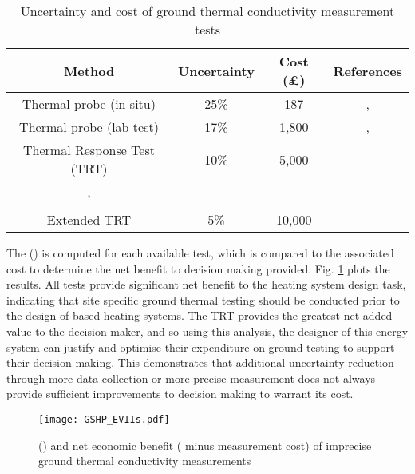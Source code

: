 \begin{table}[h]
    \centering
    \renewcommand{\arraystretch}{1}
    \begin{tabular}{c|c|c|c} \toprule \toprule
        Method & Uncertainty & Cost (£) & References \\ \midrule
        Thermal probe (in situ) & 25\% & 187 & {\footnotesize \citep{king2012FieldDeterminationShallow}, \citep{sunbeltrentals2023ThermtestTLS100Thermal}} \\
        Thermal probe (lab test) & 17\% & 1,800 & {\footnotesize \citep{low2013MeasuringSoilThermal}, \citep{basaltridgetestinglaboratory2024BasaltRidgeTesting}} \\
        Thermal Response Test (TRT) & 10\% & 5,000 & \makecell{\footnotesize \citep{choi2021DevelopmentChillerattachedApparatus},\\[-.5ex] \footnotesize\citep{spitler2000SituMeasurementGround},\\[-.5ex] \footnotesize\citep{tang2019SensitiveAnalysisEffective}} \\
        Extended TRT & 5\% & 10,000 & -- \\
        \bottomrule \bottomrule
    \end{tabular}
    \smallskip
    \caption{Uncertainty and cost of ground thermal conductivity measurement tests}
    \label{tab:ground-tests}
\end{table}

The  () is computed for each available test, which is compared to the associated cost to determine the net benefit to decision making provided. Fig. \ref{fig:GSHP-EVIIs} plots the results. All tests provide significant net benefit to the heating system design task, indicating that site specific ground thermal testing should be conducted prior to the design of  based heating systems. The TRT provides the greatest net added value to the decision maker, and so using this  analysis, the designer of this energy system can justify and optimise their expenditure on ground testing to support their decision making. This demonstrates that additional uncertainty reduction through more data collection or more precise measurement does not always provide sufficient improvements to decision making to warrant its cost.\\

\begin{figure}[h]
    \vspace*{-0.5cm}
    \centering
    \texttt{[image: GSHP\_EVIIs.pdf]}
    \vspace*{-0.2cm}
    \caption{ () and net economic benefit ( minus measurement cost) of imprecise ground thermal conductivity measurements}
    \label{fig:GSHP-EVIIs}
\end{figure}


